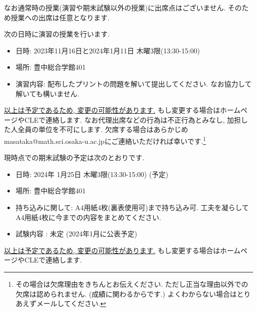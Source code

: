 \documentclass[dvipdfmx,a4paper,11pt]{article}
\theoremstyle{definition}
\begin{document}
なお通常時の授業(演習や期末試験以外の授業)に出席点はございません. そのため授業への出席は任意となります. 


\medskip
{}

次の日時に演習の授業を行います. 
\begin{itemize}
  \setlength{\parskip}{0cm} 
  \setlength{\itemsep}{0cm}
\item 日時: 2023年11月16日と2024年1月11日 木曜3限(13:30-15:00)
\item 場所: 豊中総合学館401
\item 演習内容: 配布したプリントの問題を解いて提出してください. なお協力して解いても構いません. 
\end{itemize}
\underline{以上は予定であるため, 変更の可能性があります.} もし変更する場合はホームページやCLEで連絡します. 
なお代理出席などの行為は不正行為とみなし, 加担した人全員の単位を不可にします.
欠席する場合はあらかじめmasataka@math.sci.osaka-u.ac.jpにご連絡いただければ幸いです.\footnote{その場合は欠席理由をきちんとお伝えください. ただし正当な理由以外での欠席は認められません. (成績に関わるからです.) よくわからない場合はとりあえずメールしてください.}

\newpage
{}

現時点での期末試験の予定は次のとおりです. 
\begin{itemize}
  \setlength{\parskip}{0cm} 
  \setlength{\itemsep}{0cm}
\item 日時: 2024年 1月25日 木曜3限(13:30-15:00) (予定)
\item 場所: 豊中総合学館401
\item 持ち込みに関して: A4用紙4枚(裏表使用可)まで持ち込み可. 工夫を凝らしてA4用紙4枚に今までの内容をまとめてください.
\item 試験内容 : 未定 (2024年1月に公表予定)
\end{itemize}
\underline{以上は予定であるため, 変更の可能性があります.} もし変更する場合はホームページやCLEで連絡します. 
\end{document}
